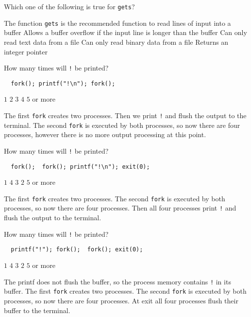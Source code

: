 \variant
Which one of the following is true for {\tt gets}?
\begin{answers}
\answer The function {\tt gets} is the recommended function to read lines of input into a buffer
\correctanswer Allows a buffer overflow if the input line is longer than the buffer
\answer Can only read text data from a file
\answer Can only read binary data from a file
\answer Returns an integer pointer
\end{answers}
\begin{solution}
\end{solution}


\variant
How many times will {\tt !} be printed?
\begin{verbatim}
  fork(); printf("!\n"); fork();
\end{verbatim}
\begin{answers}
\answer $1$
\correctanswer $2$
\answer $3$
\answer $4$
\answer $5$ or more
\end{answers}
\begin{solution}
The first {\tt fork} creates two processes. Then we print {\tt !} and flush the output to the terminal. The second {\tt fork} is executed by both processes, so now there are four processes, however there is no more output processing at this point.
\end{solution}

\variant
How many times will {\tt !} be printed?
\begin{verbatim}
  fork();  fork(); printf("!\n"); exit(0);
\end{verbatim}
\begin{answers}
\answer $1$
\correctanswer $4$
\answer $3$
\answer $2$
\answer $5$ or more
\end{answers}
\begin{solution}
The first {\tt fork} creates two processes.  The second {\tt fork} is executed by both processes, so now there are four processes.
Then all four processes print {\tt !} and flush the output to the terminal.

\end{solution}

\variant
How many times will {\tt !} be printed?
\begin{verbatim}
  printf("!"); fork();  fork(); exit(0);
\end{verbatim}
\begin{answers}
\answer $1$
\correctanswer $4$
\answer $3$
\answer $2$
\answer $5$ or more
\end{answers}
\begin{solution}
The printf does not flush the buffer, so the process memory contains {\tt !} in its buffer.
The first {\tt fork} creates two processes.  The second {\tt fork} is executed by both processes, so now there are four processes.
At exit all four processes flush their buffer to the terminal.
\end{solution}




